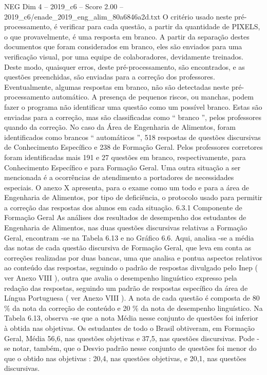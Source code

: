 \begin{textsample}{NEG Dim 4 – 2019\_c6 – Score 2.00 – 2019\_c6/enade\_2019\_eng\_alim\_80a6846a2d.txt}
O critério usado neste pré-processamento, é verificar para cada questão, a partir da quantidade de PIXELS, o que provavelmente, é uma resposta em branco.
A partir da separação destes documentos que foram considerados em branco, eles são enviados para uma verificação visual, por uma equipe de colaboradores, devidamente treinados.
Deste modo, quaisquer erros, deste pré-processamento, são encontrados, e as questões preenchidas, são enviadas para a correção dos professores.
Eventualmente, algumas respostas em branco, não são detectadas neste pré-processamento automático.
A presença de pequenos riscos, ou manchas, podem fazer o programa não identificar uma questão como um possível branco.
Estas são enviadas para a correção, mas são classificadas como “ branco ”, pelos professores quando da correção.
No caso da Área de Engenharia de Alimentos, foram identificados como brancos “ automáticos ”, 518 respostas de questões discursivas de Conhecimento Específico e 238 de Formação Geral.
Pelos professores corretores foram identificadas mais 191 e 27 questões em branco, respectivamente, para Conhecimento Específico e para Formação Geral.
Uma outra situação a ser mencionada é a ocorrências de atendimento a portadores de necessidades especiais.
O anexo X apresenta, para o exame como um todo e para a área de Engenharia de Alimentos, por tipo de deficiência, o protocolo usado para permitir a correção das respostas dos alunos em cada situação. 6.3.1 Componente de Formação Geral As análises dos resultados de desempenho dos estudantes de Engenharia de Alimentos, nas duas questões discursivas relativas a Formação Geral, encontram -se na Tabela 6.13 e no Gráfico 6.6.
Aqui, analisa -se a média das notas de cada questão discursiva de Formação Geral, que leva em conta as correções realizadas por duas bancas, uma que analisa e pontua aspectos relativos ao conteúdo das respostas, seguindo o padrão de respostas divulgado pelo Inep ( ver Anexo VIII ), outra que avalia o desempenho linguístico expresso pela redação das respostas, seguindo um padrão de respostas específico da área de Língua Portuguesa ( ver Anexo VIII ).
A nota de cada questão é composta de 80 \% da nota da correção de conteúdo e 20 \% da nota de desempenho linguístico.
Na Tabela 6.13, observa -se que a nota Média nesse conjunto de questões foi inferior à obtida nas objetivas.
Os estudantes de todo o Brasil obtiveram, em Formação Geral, Média 56,6, nas questões objetivas e 37,5, nas questões discursivas.
Pode -se notar, também, que o Desvio padrão nesse conjunto de questões foi menor do que o obtido nas objetivas : 20,4, nas questões objetivas, e 20,1, nas questões discursivas.

\end{textsample}
